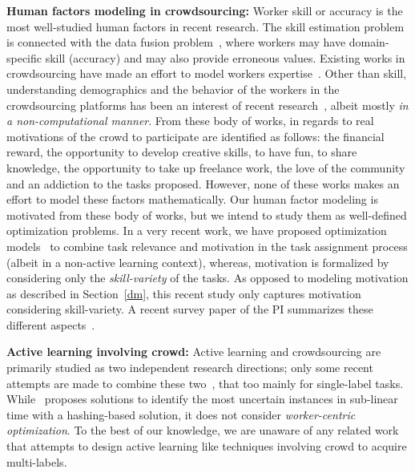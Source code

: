 {\bf Human factors modeling in crowdsourcing:} Worker skill or accuracy is the most well-studied human factors in recent research. The skill estimation problem is connected with the data fusion problem~\cite{survey}, where workers may have domain-specific skill (accuracy) and  may also provide erroneous values. Existing works in crowdsourcing have made an effort to model workers expertise~\cite{chienJuHo,kddcrowd,joglekar2015comprehensive}. Other than skill, understanding demographics and the behavior of the workers in the crowdsourcing platforms has been an interest of recent research~\cite{motiv00,motiv0,motiv1,motiv2,motiv3,motiv4}, albeit mostly {\em in a non-computational manner}. From these body of works, in regards to real motivations of the crowd to participate are identified as follows: the financial reward, the opportunity to develop creative skills, to have fun, to share knowledge, the opportunity to take up freelance work, the love of the community and an addiction to the tasks proposed. However, none of these works makes an effort to model these factors mathematically. Our human factor modeling is motivated from these body of works, but we intend to study them as well-defined optimization problems. In a very recent work, we have proposed optimization models~\cite{edbt172} to combine task relevance and motivation in the task assignment process (albeit in a non-active learning context), whereas, motivation is formalized by considering only the {\em skill-variety} of the tasks. As opposed to modeling motivation as described in Section~\ref{dm}, this recent study only captures motivation \cite{hackman1976motivation} considering skill-variety. A recent survey paper of the PI summarizes these different aspects~\cite{amer2016toward}.

{\bf Active learning involving crowd:} Active learning and crowdsourcing are primarily studied as two independent research directions; only some recent attempts are made to combine these two~\cite{active-learning-cs1,active-learning-cs2,non-active-learning1,mozafari2014scaling, corleone,clamshell,vijayanarasimhan2014large},
that too mainly for single-label tasks. While~\cite{active-learning-cs2} proposes  solutions to identify the most uncertain instances in sub-linear time with a hashing-based solution, it does not consider {\em worker-centric optimization}. To the best of our knowledge, we are unaware of any related work that  attempts to design active learning like techniques involving crowd to acquire multi-labels. 


